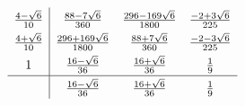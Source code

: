 \begin{gather*}
  \def\arraystretch{1.5}
  \begin{array}{c|ccc}
    \frac{4-\sqrt{6}}{10}
    & \frac{88-7\sqrt6}{360}
    & \frac{296-169\sqrt6}{1800}
    & \frac{-2+3\sqrt{6}}{225}
    \\
    \frac{4+\sqrt{6}}{10}
    & \frac{296+169\sqrt{6}}{1800}
    & \frac{88+7\sqrt{6}}{360}
    & \frac{-2-3\sqrt6}{225}
    \\
    1
    & \frac{16-\sqrt{6}}{36}
    & \frac{16+\sqrt{6}}{36}
    & \frac19
    \\\hline
    & \frac{16-\sqrt{6}}{36}
    & \frac{16+\sqrt{6}}{36}
    & \frac19
  \end{array}  
\end{gather*}

